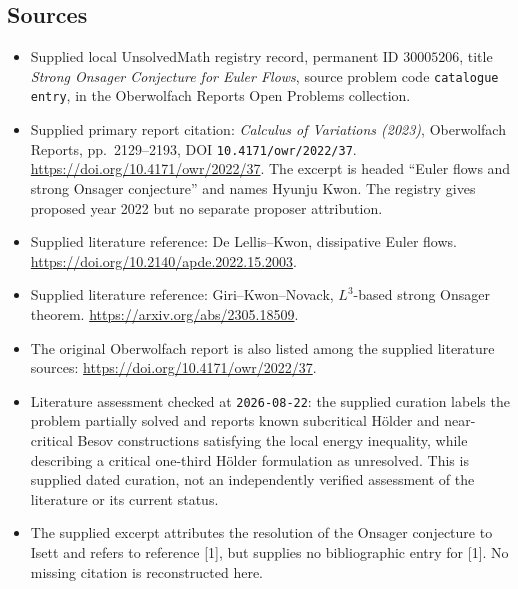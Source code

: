 \documentclass[11pt]{article}
\begin{document}
\subsection{Sources}
\begin{itemize}
\item Supplied local UnsolvedMath registry record, permanent ID \(30005206\), title \emph{Strong Onsager Conjecture for Euler Flows}, source problem code \texttt{catalogue entry}, in the Oberwolfach Reports Open Problems collection.
\item Supplied primary report citation: \emph{Calculus of Variations (2023)}, Oberwolfach Reports, pp.\ 2129--2193, DOI \texttt{10.4171/owr/2022/37}. \url{https://doi.org/10.4171/owr/2022/37}. The excerpt is headed ``Euler flows and strong Onsager conjecture'' and names Hyunju Kwon. The registry gives proposed year 2022 but no separate proposer attribution.
\item Supplied literature reference: De Lellis--Kwon, dissipative Euler flows. \url{https://doi.org/10.2140/apde.2022.15.2003}.
\item Supplied literature reference: Giri--Kwon--Novack, \(L^3\)-based strong Onsager theorem. \url{https://arxiv.org/abs/2305.18509}.
\item The original Oberwolfach report is also listed among the supplied literature sources: \url{https://doi.org/10.4171/owr/2022/37}.
\item Literature assessment checked at \texttt{2026-08-22}: the supplied curation labels the problem partially solved and reports known subcritical Hölder and near-critical Besov constructions satisfying the local energy inequality, while describing a critical one-third Hölder formulation as unresolved. This is supplied dated curation, not an independently verified assessment of the literature or its current status.
\item The supplied excerpt attributes the resolution of the Onsager conjecture to Isett and refers to reference [1], but supplies no bibliographic entry for [1]. No missing citation is reconstructed here.
\end{itemize}
\end{document}

